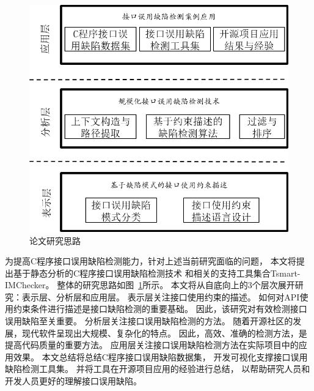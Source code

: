\begin{figure}[b]
	\centering
	\includegraphics[width=0.85\linewidth]{figures/cp1-overview.png}
	\caption{
		论文研究思路
	}
	\label{fig:1-3-overview}
\end{figure}

为提高C程序接口误用缺陷检测能力，针对上述当前研究面临的问题，
本文将提出基于静态分析的C程序接口误用缺陷检测技术
和相关的支持工具集合Tsmart-IMChecker。
整体的研究思路如图~\ref{fig:1-3-overview}所示。
本文将从自底向上的3个层次展开研究：表示层、分析层和应用层。
表示层关注接口使用约束的描述。
如何对API使用约束条件进行描述是接口缺陷检测的重要基础。
因此，该研究对有效检测接口误用缺陷至关重要。
分析层关注接口误用缺陷检测的方法。
随着开源社区的发展，现代软件呈现出大规模、复杂化的特点。
因此，高效、准确的检测方法，是提高代码质量的重要方法。
应用层关注接口误用缺陷检测方法在实际项目中的应用效果。
本文总结将总结C程序接口误用缺陷数据集，
开发可视化支撑接口误用缺陷检测工具集。
并将工具在开源项目应用的经验进行总结，
以帮助研究人员和开发人员更好的理解接口误用缺陷。

